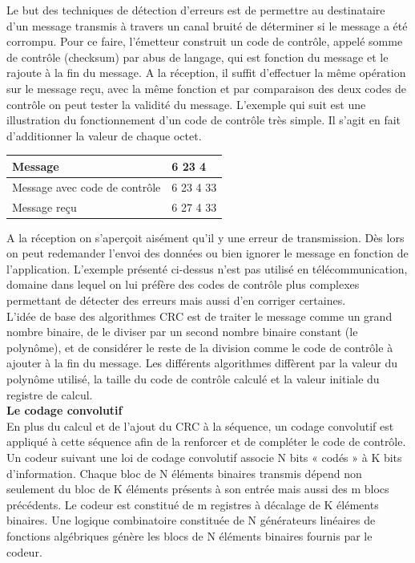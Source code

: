 Le but des techniques de détection d’erreurs est de permettre au destinataire d’un message transmis à travers un canal bruité de déterminer si le message a été corrompu. Pour ce faire, l’émetteur construit un code de contrôle, appelé somme de contrôle (checksum) par abus de langage, qui est fonction du message et le rajoute à la fin du message. A la réception, il suffit d’effectuer la même opération sur le message reçu, avec la même fonction et par comparaison des deux codes de contrôle on peut tester la validité du message. L’exemple qui suit est une illustration du fonctionnement d’un code de contrôle très simple. Il s’agit en fait d’additionner la valeur de chaque octet.

\begin{center}
\begin{tabular}{|l|l|}
\hline
Message & 6 23 4\\ \hline
Message avec code de contrôle & 6 23 4 33\\ \hline
Message reçu & 6 2{\color{red}7} 4 33\\ \hline
\end{tabular}
\end{center}

A la réception on s’aperçoit aisément qu’il y une erreur de transmission. Dès lors on peut redemander l’envoi des données ou bien ignorer le message en fonction de l’application. L’exemple présenté ci-dessus n’est pas utilisé en télécommunication, domaine dans lequel on lui préfère des codes de contrôle plus complexes permettant de détecter des erreurs mais aussi d’en corriger certaines.\\

L’idée de base des algorithmes CRC est de traiter le message comme un grand nombre binaire, de le diviser par un second nombre binaire constant (le polynôme), et de considérer le reste de la division comme le code de contrôle à ajouter à la fin du message. Les différents algorithmes diffèrent par la valeur du polynôme utilisé, la taille du code de contrôle calculé et la valeur initiale du registre de calcul.\\

\textbf{Le codage convolutif}\\
En plus du calcul et de l’ajout du CRC à la séquence, un codage convolutif est appliqué à cette séquence afin de la renforcer et de compléter le code de contrôle.\\

Un codeur suivant une loi de codage convolutif associe N bits « codés » à K bits d'information. Chaque bloc de N éléments binaires transmis dépend non seulement du bloc de K éléments présents à son entrée mais aussi des m blocs précédents. Le codeur est constitué de m registres à décalage de K éléments binaires. Une logique combinatoire constituée de N générateurs linéaires de fonctions algébriques génère les blocs de N éléments binaires fournis par le codeur.




